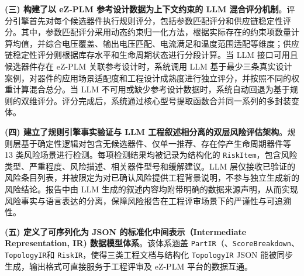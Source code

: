 \textbf{(三) 构建了以 eZ-PLM 参考设计数据为上下文约束的 LLM 混合评分机制}。评分引擎首先对每个候选器件执行规则评分，包括参数匹配评分和供应链稳定性评分。其中，参数匹配评分采用动态约束归一化方法，根据实际存在的约束项数量计算均值，并综合电压覆盖、输出电压匹配、电流满足和温度范围适配等维度；供应链稳定性评分则根据库存水平和生命周期状态进行分段计算。当 LLM 接口可用且候选器件存在 eZ-PLM 关联参考设计时，系统调用 LLM 基于最少三条真实设计案例，对器件的应用场景适配度和工程设计成熟度进行独立评分，并按照不同的权重计算混合总分。当 LLM 不可用或缺少参考设计数据时，系统自动回退为基于规则的双维评分。评分完成后，系统通过核心型号提取函数合并同一系列的多封装变体。

\textbf{(四) 建立了规则引擎事实验证与 LLM 工程叙述相分离的双层风险评估架构}。规则层基于确定性逻辑对包含无候选器件、仅单一推荐、存在停产生命周期器件等 13 类风险场景进行检测。每项检测结果均被记录为结构化的 \texttt{RiskItem}，包含风险类型、严重程度、风险描述、相关器件型号和缓解建议。LLM 层仅接收已验证的风险条目列表，并被限定为对已确认风险提供工程背景说明，不参与独立生成新的风险结论。报告中由 LLM 生成的叙述内容均附带明确的数据来源声明，从而实现风险事实与语言表达的分离，保障风险报告在工程评审场景下的严谨性与可追溯性。

\textbf{(五) 定义了可序列化为 JSON 的标准化中间表示（Intermediate Representation, IR) 数据模型体系}。该体系涵盖 \texttt{PartIR}（、\texttt{ScoreBreakdown}、\texttt{TopologyIR}和 \texttt{RiskIR}，使得三类工程文档与结构化 \texttt{TopologyIR} JSON 能被同步生成，输出格式可直接服务于工程评审及 eZ-PLM 平台的数据互通。

